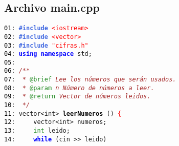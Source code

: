 \documentclass[a4paper,10pt]{scrartcl}
\begin{document}
   \subsection{Archivo main.cpp}
   \small
   \noindent
   \texttt{\mbox{}\texttt{\textcolor{Black}{01:}} \textbf{\textcolor{RoyalBlue}{\#include}}\ \texttt{\textcolor{Red}{\textless{}iostream\textgreater{}}} \\
   \mbox{}\texttt{\textcolor{Black}{02:}} \textbf{\textcolor{RoyalBlue}{\#include}}\ \texttt{\textcolor{Red}{\textless{}vector\textgreater{}}} \\
   \mbox{}\texttt{\textcolor{Black}{03:}} \textbf{\textcolor{RoyalBlue}{\#include}}\ \texttt{\textcolor{Red}{"{}cifras.h"{}}} \\
   \mbox{}\texttt{\textcolor{Black}{04:}} \textbf{\textcolor{Blue}{using}}\ \textbf{\textcolor{Blue}{namespace}}\ std\textcolor{BrickRed}{;} \\
   \mbox{}\texttt{\textcolor{Black}{05:}}  \\
   \mbox{}\texttt{\textcolor{Black}{06:}} \textit{\textcolor{Brown}{/**}} \\
   \mbox{}\texttt{\textcolor{Black}{07:}} \textit{\textcolor{Brown}{\ *\ }}\textcolor{ForestGreen}{@brief}\textit{\textcolor{Brown}{\ Lee\ los\ números\ que\ serán\ usados.}} \\
   \mbox{}\texttt{\textcolor{Black}{08:}} \textit{\textcolor{Brown}{\ *\ }}\textcolor{ForestGreen}{@param}\textit{\textcolor{Brown}{\ n\ Número\ de\ números\ a\ leer.}} \\
   \mbox{}\texttt{\textcolor{Black}{09:}} \textit{\textcolor{Brown}{\ *\ }}\textcolor{ForestGreen}{@return}\textit{\textcolor{Brown}{\ Vector\ de\ números\ leidos.}} \\
   \mbox{}\texttt{\textcolor{Black}{10:}} \textit{\textcolor{Brown}{\ */}} \\
   \mbox{}\texttt{\textcolor{Black}{11:}} \textcolor{TealBlue}{vector\textless{}int\textgreater{}}\ \textbf{\textcolor{Black}{leerNumeros}}\ \textcolor{BrickRed}{()}\ \textcolor{Red}{\{} \\
   \mbox{}\texttt{\textcolor{Black}{12:}} \ \ \ \ \textcolor{TealBlue}{vector\textless{}int\textgreater{}}\ numeros\textcolor{BrickRed}{;} \\
   \mbox{}\texttt{\textcolor{Black}{13:}} \ \ \ \ \textcolor{ForestGreen}{int}\ leido\textcolor{BrickRed}{;} \\
   \mbox{}\texttt{\textcolor{Black}{14:}} \ \ \ \ \textbf{\textcolor{Blue}{while}}\ \textcolor{BrickRed}{(}cin\ \textcolor{BrickRed}{\textgreater{}\textgreater{}}\ leido\textcolor{BrickRed}{)} \\
}
\end{document}

